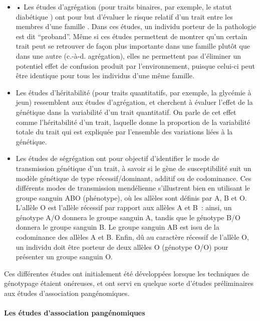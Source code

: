 \documentclass[11pt,a4paper,notrimn]{krantz}
\let\oldparagraph\paragraph
\renewcommand{\paragraph}[1]{\oldparagraph{#1}\mbox{}}
\theoremstyle{definition}
\theoremstyle{definition}
\theoremstyle{remark}
\begin{document}
\begin{itemize}
\item
  • Les études d'agrégation (pour traits binaires, par exemple, le
  statut diabétique
  \citep{bijanzadeh_recurrence_2017, weijnen_risk_2002}) ont pour but
  d'évaluer le risque relatif d'un trait entre les membres d'une famille
  \citep{laird_15_2000}. Dans ces études, un individu porteur de la
  pathologie est dit ``proband''. Même si ces études permettent de
  montrer qu'un certain trait peut se retrouver de façon plus importante
  dans une famille plutôt que dans une autre (c.-à-d. agrégation), elles
  ne permettent pas d'éliminer un potentiel effet de confusion produit
  par l'environnement, puisque celui-ci peut être identique pour tous
  les individus d'une même famille.
\item
  Les études d'héritabilité (pour traits quantitatifs, par exemple, la
  glycémie à jeun) ressemblent aux études d'agrégation, et cherchent à
  évaluer l'effet de la génétique dans la variabilité d'un trait
  quantitatif. On parle de cet effet comme l'héritabilité d'un trait,
  laquelle donne la proportion de la variabilité totale du trait qui est
  expliquée par l'ensemble des variations liées à la génétique.
\item
  Les études de ségrégation ont pour objectif d'identifier le mode de
  transmission génétique d'un trait, à savoir si le gène de
  susceptibilité suit un modèle génétique de type récessif/dominant,
  additif ou de codominance. Ces différents modes de transmission
  mendélienne s'illustrent bien en utilisant le groupe sanguin ABO
  (phénotype), où les allèles sont définis par A, B et O. L'allèle O est
  l'allèle récessif par rapport aux allèles A et B~: ainsi, un génotype
  A/O donnera le groupe sanguin A, tandis que le génotype B/O donnera le
  groupe sanguin B. Le groupe sanguin AB est issu de la codominance des
  allèles A et B. Enfin, dû au caractère récessif de l'allèle O, un
  individu doit être porteur de deux allèles O (génotype O/O) pour
  présenter un groupe sanguin O.
\end{itemize}

Ces différentes études ont initialement été développées lorsque les
techniques de génotypage étaient onéreuses, et ont servi en quelque
sorte d'études préliminaires aux études d'association pangénomiques.

\paragraph{Les études d'association
pangénomiques}\label{les-etudes-dassociation-pangenomiques}
\end{document}
